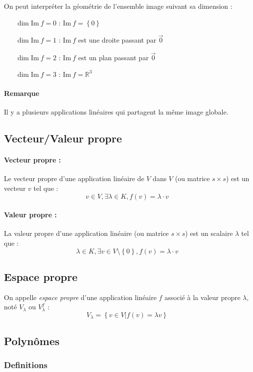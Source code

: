\documentclass[a4paper,10pt]{article}
\newcommand{\set}[1]{\left\lbrace #1 \right\rbrace } %
\newcommand{\im}{\mathrm{Im}\:} %
\begin{document}
   On peut interpréter la géométrie de l'ensemble image suivant sa dimension :
   \begin{itemize}
    \item[$\dim \im f = 0$] : $\im f = \set{0}$
    \item[$\dim \im f = 1$] : $\im f$ est une droite passant par $\vec{0}$
    \item[$\dim \im f = 2$] : $\im f$ est un plan passant par $\vec{0}$
    \item[$\dim \im f = 3$] : $\im f = \mathbb{R}^3$
   \end{itemize}

  \paragraph{Remarque} Il y a plusieurs applications linéaires qui partagent la même image globale.

 \subsection{Vecteur/Valeur propre}
  \paragraph{Vecteur propre :} Le vecteur propre d'une application linéaire de $V$ dans $V$ (ou matrice $s \times s$) est un vecteur $v$ tel que : $$v \in V, \exists \lambda \in K, f(v)=\lambda \cdot v$$
  \paragraph{Valeur propre :} La valeur propre d'une application linéaire (ou matrice $s \times s$) est un scalaire $\lambda$ tel que : $$\lambda \in K, \exists v \in V \setminus \set{0}, f(v)=\lambda \cdot v$$
  
 \subsection{Espace propre}
  On appelle \textit{espace propre} d'une application linéaire $f$ associé à la
  valeur propre $\lambda$, noté $V_\lambda$ ou $V_\lambda^f$ :
   $$V_{\lambda}=\set{v\in V | f(v)=\lambda v}$$

 \subsection{Polynômes}
  \subsubsection{Definitions}
\end{document}
